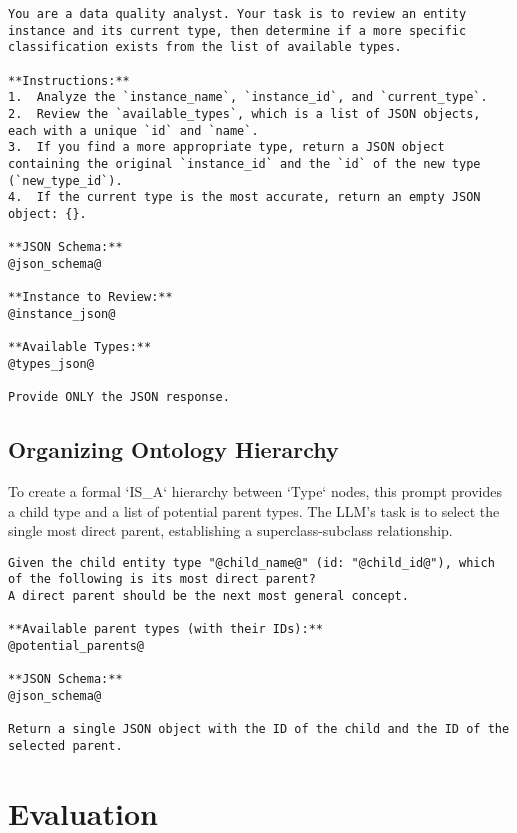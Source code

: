 \begin{lstlisting}[style=promptstyle, caption={Prompt for correcting the type of an instance node.}, label={lst:prompt_itc}]
You are a data quality analyst. Your task is to review an entity instance and its current type, then determine if a more specific classification exists from the list of available types.

**Instructions:**
1.  Analyze the `instance_name`, `instance_id`, and `current_type`.
2.  Review the `available_types`, which is a list of JSON objects, each with a unique `id` and `name`.
3.  If you find a more appropriate type, return a JSON object containing the original `instance_id` and the `id` of the new type (`new_type_id`).
4.  If the current type is the most accurate, return an empty JSON object: {}.

**JSON Schema:**
@json_schema@

**Instance to Review:**
@instance_json@

**Available Types:**
@types_json@

Provide ONLY the JSON response.
\end{lstlisting}

\subsection{Organizing Ontology Hierarchy}
To create a formal `IS\_A` hierarchy between `Type` nodes, this prompt provides a child type and a list of potential parent types. The LLM's task is to select the single most direct parent, establishing a superclass-subclass relationship.

\begin{lstlisting}[style=promptstyle, caption={Prompt for organizing the type hierarchy.}, label={lst:prompt_ooh}]
Given the child entity type "@child_name@" (id: "@child_id@"), which of the following is its most direct parent?
A direct parent should be the next most general concept.

**Available parent types (with their IDs):**
@potential_parents@

**JSON Schema:**
@json_schema@

Return a single JSON object with the ID of the child and the ID of the selected parent.
\end{lstlisting}

\section{Evaluation}

